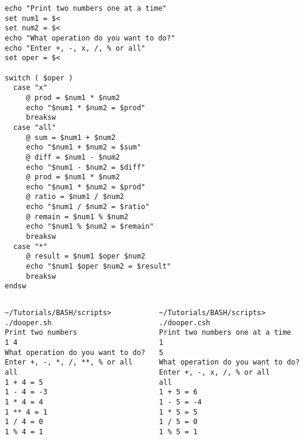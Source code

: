 \documentclass[slidestop,mathserif,compress,xcolor=svgnames]{beamer}
\newenvironment{bblock}[0]
{
\begin{beamerboxesrounded}[upper=uppercol1,lower=lowercol1,shadow=true]}
{\end{beamerboxesrounded}}
\newenvironment{eblock}[0]
{
\begin{beamerboxesrounded}[upper=uppercol2,lower=lowercol2,shadow=true]}
{\end{beamerboxesrounded}}
\begin{document}
\begin{frame}
\begin{columns}
\begin{bblock}{}
{\begin{verbatim}
echo "Print two numbers one at a time"
set num1 = $<
set num2 = $<
echo "What operation do you want to do?"
echo "Enter +, -, x, /, % or all"
set oper = $<

switch ( $oper )
  case "x"
     @ prod = $num1 * $num2
     echo "$num1 * $num2 = $prod"
     breaksw
  case "all"
     @ sum = $num1 + $num2
     echo "$num1 + $num2 = $sum"
     @ diff = $num1 - $num2
     echo "$num1 - $num2 = $diff"
     @ prod = $num1 * $num2
     echo "$num1 * $num2 = $prod"
     @ ratio = $num1 / $num2
     echo "$num1 / $num2 = $ratio"
     @ remain = $num1 % $num2
     echo "$num1 % $num2 = $remain"
     breaksw
  case "*"
     @ result = $num1 $oper $num2
     echo "$num1 $oper $num2 = $result"
     breaksw
endsw
        \end{verbatim}
      }
    \end{bblock}
  \end{columns}
  \framebreak
  \begin{columns}
    \begin{eblock}{}
      {\fontsize{4}{5.5}\selectfont
        \begin{verbatim}
~/Tutorials/BASH/scripts> ./dooper.sh 
Print two numbers
1 4
What operation do you want to do?
Enter +, -, *, /, **, % or all
all
1 + 4 = 5
1 - 4 = -3
1 * 4 = 4
1 ** 4 = 1
1 / 4 = 0
1 % 4 = 1
        \end{verbatim}
      }
    \end{eblock}
    \begin{bblock}{}
      {\fontsize{4}{5.5}\selectfont
        \begin{verbatim}
~/Tutorials/BASH/scripts> ./dooper.csh 
Print two numbers one at a time
1
5
What operation do you want to do?
Enter +, -, x, /, % or all
all
1 + 5 = 6
1 - 5 = -4
1 * 5 = 5
1 / 5 = 0
1 % 5 = 1
        \end{verbatim}
      }
    \end{bblock}
  \end{columns}
\end{frame}
\end{document}
